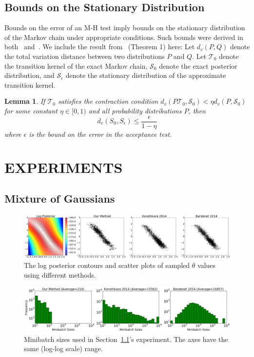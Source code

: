 \documentclass{article}
\newtheorem{lemma}{Lemma}
\begin{document}
\subsection{Bounds on the Stationary Distribution}
Bounds on the error of an M-H test imply bounds on the stationary distribution
of the Markov chain under appropriate conditions. Such bounds were derived in
both~\cite{cutting_mh_2014} and~\cite{icml2014c1_bardenet14}. We include the
result from~\cite{cutting_mh_2014} (Theorem 1) here: Let $d_v(P,Q)$ denote the
total variation distance between two distributions $P$ and $Q$.  Let
$\mathcal{T}_0$ denote the transition kernel of the exact Markov chain,
$\mathcal{S}_0$ denote the exact posterior distribution, and
$\mathcal{S}_{\epsilon}$ denote the stationary distribution of the approximate
transition kernel. 
\begin{lemma}
If $\mathcal{T}_0$ satisfies the contraction condition
$d_v(P\mathcal{T}_0,\mathcal{S}_0) < \eta d_v(P,\mathcal{S}_0)$ for some
constant $\eta\in [0,1)$ and all probability distributions $P$, then
\begin{equation}
      d_v(S_0, S_{\epsilon}) \leq\frac{\epsilon}{1-\eta}
\end{equation}
where $\epsilon$ is the bound on the error in the acceptance test. 
\end{lemma}


\section{EXPERIMENTS}\label{sec:experiments}


\subsection{Mixture of Gaussians}\label{ssec:gaussians}

\begin{figure}[t]
    \centering
    \includegraphics[width=0.9\linewidth]{posterior_of_gaussian.png}
    \caption{
    The log posterior contours and scatter plots of sampled $\theta$ values
    using different methods. 
    }
    \label{fig:gauss_mix_1}
\end{figure}
\begin{figure}[t]
    \centering
    \includegraphics[width=0.9\linewidth]{minibatch_size_gaussian.png}
    \caption{
    Minibatch sizes used in Section~\ref{ssec:gaussians}'s experiment. The axes
    have the same (log-log scale) range.
    }
    \label{fig:gauss_mix_2}
\end{figure}
\end{document}
